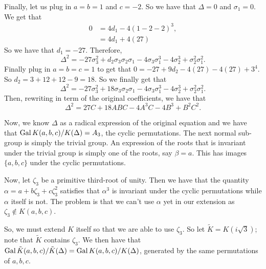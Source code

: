 Finally, let us plug in \(a = b = 1\) and \(c = -2\). So we have that \(\Delta = 0\) and \(\sigma_1 = 0\).
We get that
\begin{align}
0 & = 4d_1 - 4 (1 - 2 - 2)^3, \\
  & = 4d_1 + 4 (27) 
\end{align}
So we have that \(d_1 = -27\).
Therefore,
\begin{equation}
\Delta^2 = -27 \sigma_3^2 + d_2 \sigma_3 \sigma_2 \sigma_1 
- 4 \sigma_3 \sigma_1^3 - 4 \sigma_2^3 + \sigma_2^2 \sigma_1^2.
\end{equation}
Finally plug in \(a = b = c = 1\) to get that \(0 = -27 + 9d_2 - 4 (27) - 4 (27) + 3^4\). So
\(d_2 = 3 + 12 + 12 - 9 = 18\). So we finally get that
\begin{equation}
\Delta^2 = -27 \sigma_3^2 + 18 \sigma_3 \sigma_2 \sigma_1 
- 4 \sigma_3 \sigma_1^3 - 4 \sigma_2^3 + \sigma_2^2 \sigma_1^2.
\end{equation}
Then, rewriting in term of the original coefficients, we have that
\begin{equation}
\Delta^2 = 27 C + 18 ABC
- 4 A^3C - 4 B^3 + B^2 C^2.
\end{equation}

Now, we know \(\Delta\) as a radical expression of the original equation and we have that
\(\operatorname{Gal} K(a, b, c) / K(\Delta) = A_3\), the cyclic permutations. The next normal sub-group
is simply the trivial group. An expression of the roots that is invariant under the trivial
group is simply one of the roots, say \(\beta = a\). This has images \(\{a, b, c\}\) under
the cyclic permutations. 

Now, let \(\zeta_3\) be a primitive third-root of unity. Then we have
that the quantity \(\alpha = a + b\zeta_3 + c\zeta_3^2\) satisfies that \(\alpha^3\) is
invariant under the cyclic permutations while \(\alpha\) itself is not. The problem is
that we can't use \(\alpha\) yet in our extension as \(\zeta_3 \not \in K(a, b, c)\).

So, we must extend \(K\) itself so that we are able to use \(\zeta_3\). So let
\(\tilde K = K(i\sqrt{3})\); note that \(\tilde K\) contains \(\zeta_3\). We then have that
\(\operatorname{Gal} \tilde K(a, b, c) / \tilde K(\Delta) = \operatorname{Gal} K(a, b, c) / K(\Delta)\), generated by
the same permutations of \(a, b, c\).

